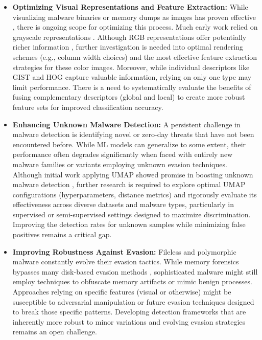 \begin{itemize}
    \item \textbf{Optimizing Visual Representations and Feature Extraction:} While visualizing malware binaries or memory dumps as images has proven effective \citep{nataraj2011malware, bozkir2021catch}, there is ongoing scope for optimizing this process. Much early work relied on grayscale representations \citep{nataraj2011malware, dai2018malware}. Although RGB representations offer potentially richer information \citep{bozkir2021catch}, further investigation is needed into optimal rendering schemes (e.g., column width choices) and the most effective feature extraction strategies for these color images. Moreover, while individual descriptors like GIST and HOG capture valuable information, relying on only one type may limit performance. There is a need to systematically evaluate the benefits of fusing complementary descriptors (global and local) to create more robust feature sets for improved classification accuracy.

    \item \textbf{Enhancing Unknown Malware Detection:} A persistent challenge in malware detection is identifying novel or zero-day threats that have not been encountered before. While ML models can generalize to some extent, their performance often degrades significantly when faced with entirely new malware families or variants employing unknown evasion techniques. Although initial work applying UMAP showed promise in boosting unknown malware detection \citep{bozkir2021catch}, further research is required to explore optimal UMAP configurations (hyperparameters, distance metrics) and rigorously evaluate its effectiveness across diverse datasets and malware types, particularly in supervised or semi-supervised settings designed to maximize discrimination. Improving the detection rates for unknown samples while minimizing false positives remains a critical gap.

    \item \textbf{Improving Robustness Against Evasion:} Fileless and polymorphic malware constantly evolve their evasion tactics. While memory forensics bypasses many disk-based evasion methods \citep{kara2022fileless}, sophisticated malware might still employ techniques to obfuscate memory artifacts or mimic benign processes. Approaches relying on specific features (visual or otherwise) might be susceptible to adversarial manipulation or future evasion techniques designed to break those specific patterns. Developing detection frameworks that are inherently more robust to minor variations and evolving evasion strategies remains an open challenge.


\end{itemize}
